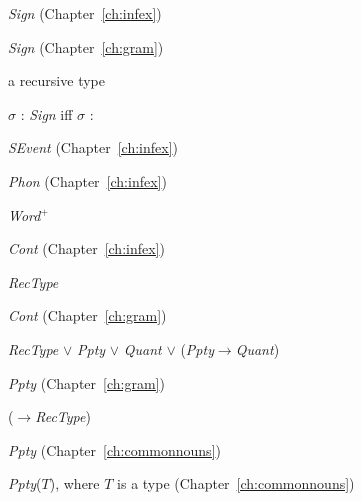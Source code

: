 \textit{Sign} (Chapter~\ref{ch:infex})


\textit{Sign} (Chapter~\ref{ch:gram})

a recursive type

$\sigma$ : \textit{Sign} iff $\sigma$ : 

\textit{SEvent} (Chapter~\ref{ch:infex})


\textit{Phon} (Chapter~\ref{ch:infex})

\textit{Word}$^+$

\textit{Cont} (Chapter~\ref{ch:infex})

\textit{RecType}

\textit{Cont} (Chapter~\ref{ch:gram})

\textit{RecType} $\vee$ \textit{Ppty} $\vee$ \textit{Quant} $\vee$ (\textit{Ppty}$\rightarrow$\textit{Quant})

\textit{Ppty} (Chapter~\ref{ch:gram})

($\rightarrow$\textit{RecType})

\textit{Ppty} (Chapter~\ref{ch:commonnouns})


\textit{Ppty}($T$), where $T$ is a type (Chapter~\ref{ch:commonnouns})


